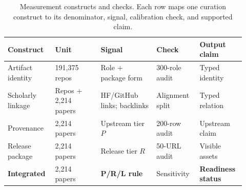 \begin{table}[!tbp]
\centering
\caption{Measurement constructs and checks. Each row maps one curation construct to its denominator, signal, calibration check, and supported claim.}
\label{tab:measurement-constructs}
\small
\setlength{\tabcolsep}{3.6pt}
\renewcommand{\arraystretch}{1.08}
\begin{tabular}{@{}p{0.17\linewidth}p{0.18\linewidth}p{0.22\linewidth}p{0.17\linewidth}p{0.18\linewidth}@{}}
\toprule
\textbf{Construct} & \textbf{Unit} & \textbf{Signal} & \textbf{Check} & \textbf{Output claim} \\
\midrule
Artifact identity & 191,375 repos & Role + package form & 300-role audit & Typed identity \\
Scholarly linkage & Repos + 2,214 papers & HF/GitHub links; backlinks & Alignment split & Typed relation \\
Provenance & 2,214 papers & Upstream tier $P$ & 200-row audit & Upstream claim \\
Release package & 2,214 papers & Release tier $R$ & 50-URL audit & Visible assets \\
\textbf{Integrated} & 2,214 papers & \textbf{P/R/L rule} & Sensitivity & \textbf{Readiness status} \\
\bottomrule
\end{tabular}
\renewcommand{\arraystretch}{1.0}
\end{table}
